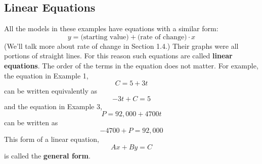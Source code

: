 \documentclass[10pt,]{book}
\newcommand{\terminology}[1]{\textbf{#1}}
\theoremstyle{plain}
\theoremstyle{definition}
\theoremstyle{definition}
\numberwithin{equation}{section}
\begin{document}
\subsection[Linear Equations]{Linear Equations}\label{subsection-3}
All the models in these examples have equations with a similar form:  \begin{equation*}y=\text{(starting value)}+\text{(rate of change)}\cdot x\end{equation*}
(We'll talk more about rate of change in Section 1.4.)  Their graphs were all portions of straight lines.  For this reason such equations are called \terminology{linear equations}.  The order of the terms in the equation does not matter.  For example, the equation in Example 1, \begin{equation*}C=5+3t\end{equation*} can be written equivalently as \begin{equation*}-3t+C=5\end{equation*} and the equation in Example 3, \begin{equation*}P=92,000+4700t\end{equation*} can be written as \begin{equation*}-4700+P=92,000\end{equation*} 
This form of a linear equation, \begin{equation*}Ax+By=C\end{equation*} is called the \terminology{general form}.%
\typeout{************************************************}
\typeout{************************************************}
\end{document}
